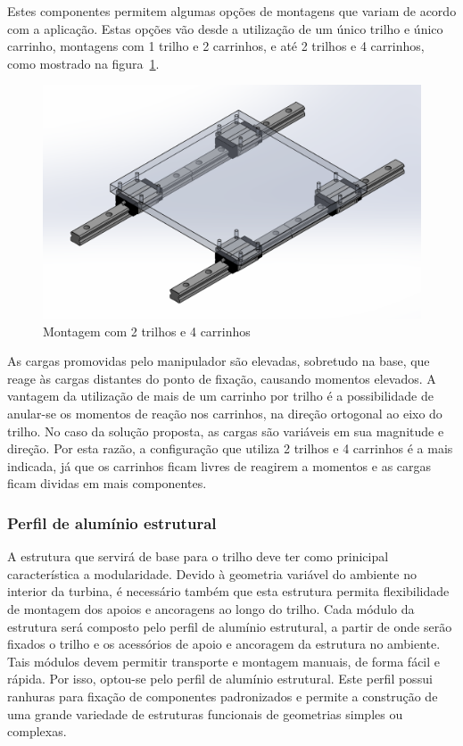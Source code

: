 Estes componentes permitem algumas opções de montagens que variam de acordo com
a aplicação. 
Estas opções vão desde a utilização de um único trilho e único carrinho,
montagens com 1 trilho e 2 carrinhos, e até 2 trilhos e 4
carrinhos, como mostrado na figura~\ref{fig::sist_2por4}.

\begin{figure}[h!]
	\centering
	\includegraphics[width=0.9\columnwidth]{figs/construcao/sist_2por4}
	\caption{Montagem com 2 trilhos e 4 carrinhos}
    \label{fig::sist_2por4}
\end{figure}

As cargas promovidas pelo manipulador são elevadas, sobretudo na base, que
reage às cargas distantes do ponto de fixação, causando momentos elevados. 
A vantagem da utilização de mais de um carrinho por trilho é a possibilidade de
anular-se os momentos de reação nos carrinhos, na direção ortogonal ao eixo do
trilho. 
No caso da solução proposta, as cargas são variáveis em sua magnitude e direção.
Por esta razão, a configuração que utiliza 2 trilhos e 4 carrinhos é a mais
indicada, já que os carrinhos ficam livres de reagirem a momentos e as cargas ficam
dividas em mais componentes.

\subsubsection{Perfil de alumínio estrutural} \label{sec::perfil}

A estrutura que servirá de base para o trilho deve ter como prinicipal
característica a modularidade. Devido à geometria variável do ambiente no
interior da turbina, é necessário também que esta estrutura permita 
flexibilidade de montagem dos apoios e ancoragens ao longo do trilho.
Cada módulo da estrutura será composto pelo perfil de alumínio estrutural, a
partir de onde serão fixados o trilho e os acessórios de apoio e ancoragem da
estrutura no ambiente.
Tais módulos devem permitir transporte e montagem manuais, de forma fácil e
rápida.
Por isso, optou-se pelo perfil de alumínio estrutural. Este perfil possui
ranhuras para fixação de componentes padronizados e permite a construção
de uma grande variedade de estruturas funcionais de geometrias simples ou
complexas.

